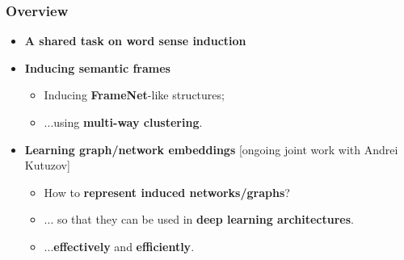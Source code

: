 \begin{frame}
  \frametitle{Overview}

  \begin{itemize}
  
  			\item \alert{\textbf{A shared task on word sense induction}} \cite{panchenko2018russe,arefyev2018russe}	
  		
  		\pause 	
  		\vspace{10pt}
  
		\item \alert{\textbf{Inducing semantic frames}} \cite{ustalov2018unsupervised} 
		\begin{itemize}
			\item Inducing \textbf{FrameNet}-like structures;
			\item ...using \textbf{multi-way clustering}.
		\end{itemize}
		
		\pause 
		\vspace{10pt} 
		
		\item \alert{\textbf{Learning graph/network embeddings}} [ongoing joint work with Andrei Kutuzov]
		\begin{itemize}
		\item How to \textbf{represent induced networks/graphs}?
		\item ... so that they can be used in \textbf{deep learning architectures}.
		\item ...\textbf{effectively} and \textbf{efficiently}.
		\end{itemize}
		
		 
				
	
			
\end{itemize}
	
\end{frame}



